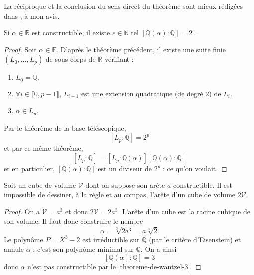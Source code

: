   \begin{remark}
    La réciproque et la conclusion du sens direct du théorème sont mieux rédigées dans \cite{[GOZ]}, à mon avis.
  \end{remark}


  \begin{corollary}
    \label{theoreme-de-wantzel-3}
    Si $\alpha \in \mathbb{R}$ est constructible, il existe $e \in \mathbb{N}$ tel $[\mathbb{Q}(\alpha):\mathbb{Q}] = 2^e$.
  \end{corollary}

  \begin{proof}
    Soit $\alpha \in \mathbb{E}$. D'après le théorème précédent, il existe une suite finie $(L_0, \dots, L_p)$ de sous-corps de $\mathbb{R}$ vérifiant :
    \begin{enumerate}[label=(\roman*)]
      \item $L_0 = \mathbb{Q}$.
      \item $\forall i \in \llbracket 0, p-1 \rrbracket$, $L_{i+1}$ est une extension quadratique (de degré $2$) de $L_i$.
      \item $\alpha \in L_p$.
    \end{enumerate}
    Par le théorème de la base téléscopique,
    \[ [L_p : \mathbb{Q}] = 2^p \]
    et par ce même théorème,
    \[ [L_p : \mathbb{Q}] = [L_p : \mathbb{Q}(\alpha)] [\mathbb{Q}(\alpha) : \mathbb{Q}] \]
    et en particulier, $[\mathbb{Q}(\alpha) : \mathbb{Q}]$ est un diviseur de $2^p$ : ce qu'on voulait.
  \end{proof}

  \begin{application}
    Soit un cube de volume $\mathcal{V}$ dont on suppose son arête $a$ constructible. Il est impossible de dessiner, à la règle et au compas, l'arête d'un cube de volume $2\mathcal{V}$.
  \end{application}

  \begin{proof}
    On a $\mathcal{V} = a^3$ et donc $ 2\mathcal{V} = 2a^3$. L'arête d'un cube est la racine cubique de son volume. Il faut donc construire le nombre
    \[ \alpha = \sqrt[3]{2a^3} = a\sqrt[3]{2} \]
    Le polynôme $P = X^3 - 2$ est irréductible sur $\mathbb{Q}$ (par le critère d'Eisenstein) et annule $\alpha$ : c'est son polynôme minimal sur $\mathbb{Q}$. On a ainsi
    \[ [\mathbb{Q}(\alpha) : \mathbb{Q}] = 3 \]
    donc $\alpha$ n'est pas constructible par le \cref{theoreme-de-wantzel-3}.
  \end{proof}

